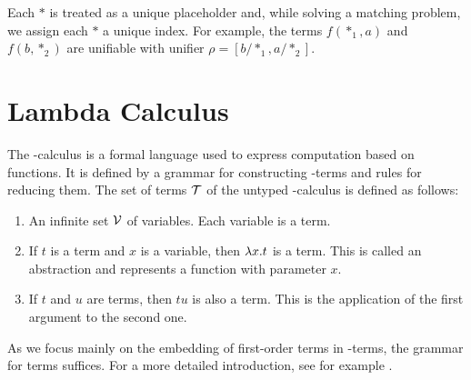 Each $*$ is treated as a unique placeholder and, while solving a matching problem, we assign each $*$ a unique index. For example, the terms $f(*_{1}, a)$ and $f(b, *_{2})$ are unifiable with unifier $\rho = [b/*_{1}, a/*_{2}]$.






\section{Lambda Calculus}
The \lam -calculus is a formal language used to express computation based on functions. It is defined by a grammar for constructing \lam -terms and rules for reducing them. The set of terms $\mathcal{T}$ of the untyped \lam -calculus is defined as follows:
\begin{enumerate}
  \item An infinite set $\mathcal{V}$ of variables. Each variable is a term.
  \item If $t$ is a term and $x$ is a variable, then $\lambda x. t$ is a term. This is called an abstraction and represents a function with parameter $x$.
  \item If $t$ and $u$ are terms, then $t u$ is also a term. This is the application of the first argument to the second one.
\end{enumerate}
As we focus mainly on the embedding of first-order terms in \lam -terms, the grammar for terms suffices. For a more detailed introduction, see for example \cite{loader_notes_nodate}.

